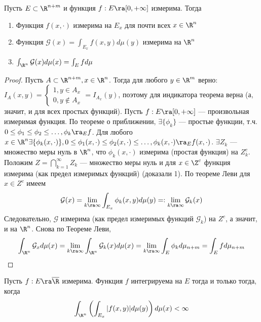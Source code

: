 \begin{theorem}[Тонелли]
    Пусть \(E \subset \R^{n + m}\) и функция \(f: E \ra [0, +\infty]\) измерима. Тогда
    \begin{enumerate}
        \item Функция \(f(x, \cdot)\) измерима на \(E_x\) для почти всех \(x \in \R^n\)
        \item Функция \(\mathcal{G}(x) = \int_{E_x}f(x, y)d\mu(y)\) измерима на \(\R^n\)
        \item \(\int_{\R^n}\mathcal{G}(x)d\mu(x) = \int_E f d \mu\)
    \end{enumerate}
\end{theorem}
\begin{proof}
    Пусть \(A \subset \R^{n + m}, x \in \R^n\). Тогда для любого \(y \in \R^m\) верно: \(I_A(x, y) = \left\{\begin{array}{ll}
        1, y \in A_x \\ 
        0, y \notin A_x
    \end{array}\right. = I_{A_x}(y)\), поэтому для индикатора теорема верна (а, значит, и для всех простых функций).
    Пусть \(f: E \ra [0, +\infty]\) --- произвольная измеримая функция. По теореме о приближении, \(\exists \{\phi_k\}\) --- простые функции, т.ч. \(0\le \phi_1 \le \phi_2 \le \dots, \phi_k \ra_E f\). Для любого \(x \in \R^n \exists \{\phi_k(x, \cdot)\}, 0 \le \phi_1(x, \cdot) \le \phi_2(x, \cdot) \le \dots, \phi_k(x, \cdot) \ra_E f(x, \cdot)\). \(\exists Z_k\) --- множество меры нуль в \(\R^n\), что \(\phi_k(x, \cdot)\) измерима (простая функция) на \(Z_k^c\). Положим \(Z = \bigcap_{k = 1}^\infty Z_k\) --- множество меры нуль и для \(x \in \Z^c\) функция измерима (как предел измеримых функций) (доказали 1). По теореме Леви для \(x \in Z^c\) имеем
    \[\mathcal{G}(x) = \lim_{k \ra \infty} \int_{E_x}\phi_k(x, y)d\mu(y) =: \lim_{k \ra \infty} \mathcal{G}_k(x)\]
    Следовательно, \(\mathcal{G}\) измерима (как предел измеримых функций \(\mathcal{G}_k\)) на \(Z^c\), а значит, и на \(\R^n\). Снова по Теореме Леви,
    \[\int_{\R^n}\mathcal{G}_xd\mu(x) = \lim_{k \ra \infty} \int_{\R^n} \mathcal{G}_k(x)d\mu(x) = \lim_{k \ra \infty} \int_E \phi_kd\mu_{n + m} = \int_E f d \mu_{n + m}\]
\end{proof}

\begin{corollary}
    Пусть \(f: E \ra \overline{\R}\) измерима. Функция \(f\) интегрируема на \(E\) тогда и только тогда, когда 
    \[\int_{\R^n}\left(\int_{E_x}|f(x, y)|d\mu(y)\right)d\mu(x) < \infty\]
\end{corollary}

